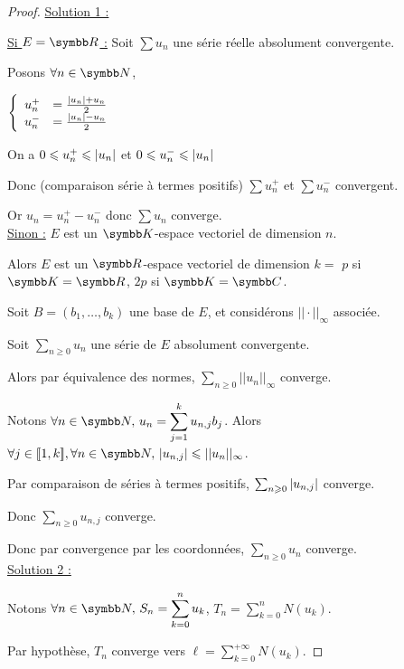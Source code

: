 \begin{proof} 
    \uline{Solution 1 :}

    \uline{Si $E = \R$ :}
    \svspace Soit $\sum u_n$ une série réelle absolument convergente.

    Posons $\forall n \in \N$,

    $\left\{ \begin{array}{rl}
        u_n^+ & = \frac{\left|u_n\right| + u_n}{ 2} \\
        u_n^- & = \frac{\left|u_n\right| - u_n}{ 2}
    \end{array} \right.$

    On a $0 \leqslant u_n^+ \leqslant \left|u_n\right|$ et $0 \leqslant u_n^- \leqslant \left|u_n\right|$

    Donc (comparaison série à termes positifs) $\sum u_n^+$ et $\sum u_n^-$ convergent. 

    Or $u_n = u_n^+ - u_n^-$ donc $\sum u_n$ converge. \\

    \uline{Sinon :} $E$ est un $\K$-espace vectoriel de dimension $n$. 
    
    Alors $E$ est un $\R$-espace vectoriel de dimension $k = $ $p$ si $\K = \R$, $2p$ si $\K = \C$.

    Soit $B = (b_1, \ldots, b_k)$ une base de $E$, et considérons $|| \cdot ||_\infty$ associée. 

    Soit $\sum_{n \geqslant 0} u_n$ une série de $E$ absolument convergente.

    Alors par équivalence des normes, $\sum_{n \geqslant 0} || u_n ||_\infty$ converge.

    Notons $\displaystyle \forall n \in \N, \, u_n = \sum_{j = 1}^k u_{n, j} b_j$.
    Alors $\forall j \in \ninter 1 k, \forall n \in \N, \, \abs{u_{n, j}} \leqslant || u_n ||_\infty$.

    Par comparaison de séries à termes positifs, $\sum_{n \geqslant 0} \left|u_{n, j}\right|$ converge.

    Donc $\sum_{n \geqslant 0} u_{n, j}$ converge. 

    Donc par convergence par les coordonnées, $\sum_{n \geqslant 0} u_n$ converge. \\

    \uline{Solution 2 :}

    Notons $\displaystyle \forall n \in \N, \, S_n = \sum_{k = 0}^n u_k $, $\displaystyle T_n = \sum_{k = 0}^n N(u_k)$.

    Par hypothèse, $T_n$ converge vers $\displaystyle \ell = \sum_{k = 0}^{+\infty} N(u_k)$.


\end{proof}
